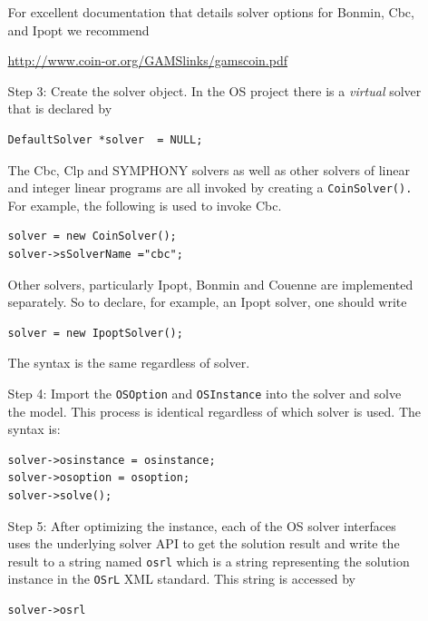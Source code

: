 \documentclass[11pt]{article}
\renewcommand{\_}{{\char"5F}}
\renewcommand{\{}{{\char"7B}}
\renewcommand{\}}{{\char"7D}}
\renewcommand{\^}{{\char"0D}}
\renewcommand{\'}{{\char"0D}}
\begin{document}
\begin{enumerate}[Step 1:]
\begin{itemize}
For excellent documentation that details solver options for Bonmin, Cbc, and Ipopt  we recommend 

\begin{center}
\url{http://www.coin-or.org/GAMSlinks/gamscoin.pdf}
\end{center}


\item[Step 3:] Create the solver object. In the OS project there is a {\it virtual} solver that 
is declared by

\begin{verbatim}
DefaultSolver *solver  = NULL;
\end{verbatim}

The Cbc, Clp and SYMPHONY solvers as well as other solvers of linear and integer linear programs
are all invoked by creating a {\tt CoinSolver().} For example, the following is used to invoke Cbc.

\begin{verbatim}
solver = new CoinSolver();
solver->sSolverName ="cbc";
\end{verbatim}

Other solvers, particularly Ipopt, Bonmin and Couenne are implemented separately. So to declare,
for example, an Ipopt solver, one should write

\begin{verbatim}
solver = new IpoptSolver();
\end{verbatim}

The syntax is the same regardless of solver. 

\item[Step 4:] Import the {\tt OSOption} and {\tt OSInstance} into the solver and solve the model. 
This process is identical regardless of which solver is used. The syntax is:

\begin{verbatim}
solver->osinstance = osinstance;
solver->osoption = osoption;	
solver->solve();
\end{verbatim}

\item[Step 5:] After optimizing the instance,  each of the OS solver interfaces uses the underlying solver API to get the solution result and write the result to a string 
named {\tt osrl} which is a string representing the solution instance in the {\tt OSrL} XML standard.  
This string is accessed by

\begin{verbatim}
solver->osrl
\end{verbatim}



\end{itemize}
\end{enumerate}
\end{document}
